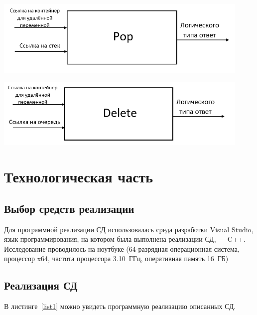 \documentclass[14pt]{article}
\begin{document}
\begin{center}
		\includegraphics[width = 0.92\textwidth, height = 0.2\textheight]{pop (1)}
		\label{fig:label7}
		
		\includegraphics[width = 0.92\textwidth, height = 0.2\textheight]{delete}
		\label{fig:label8}
		
	\end{center}
	
	\newpage
	\par 
	
	\newpage
	
	\section{Технологическая часть} 
	
	\subsection{Выбор средств реализации}
	Для программной реализации СД использовалась среда разработки Visual Studio, язык программирования, на котором была выполнена реализации СД, --- C++. 
	Исследование проводилось на ноутбуке (64-разрядная операционная система, процессор x64, частота процессора 3.10~ГГц, оперативная память 16~ГБ)\par
	
	\subsection{Реализация СД}
	В листинге~\ref{list1} можно увидеть программную реализацию описанных СД.
	
\end{document}
